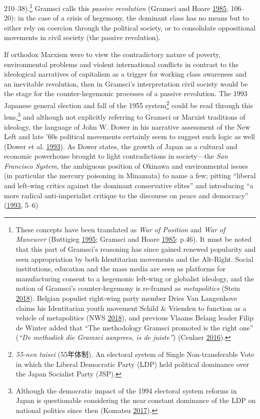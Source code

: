 \documentclass[10pt,british,A4paper,twoside]{memoir}
\begin{document}
210--38).\footnote{These concepts have been translated as \emph{War of
  Position} and \emph{War of Maneuver} (Buttigieg
  \protect\hyperlink{ref-buttigieg_gramsci_1995}{1995}; Gramsci and
  Hoare \protect\hyperlink{ref-gramsci_selections_1985}{1985}: p.46). It
  must be noted that this part of Gramsci's reasoning has since gained
  renewed popularity and seen appropriation by both Identitarian
  movements and the Alt-Right. Social institutions, education and the
  mass media are seen as platforms for manufacturing consent to a
  hegemonic left-wing or globalist ideology, and the notion of Gramsci's
  counter-hegemony is re-framed as \emph{metapolitics} (Stein
  \protect\hyperlink{ref-stein_jeff_2018}{2018}). Belgian populist
  right-wing party member Dries Van Langenhove claims his Identitarian
  youth movement Schild \& Vrienden to function as a vehicle of
  metapolitics (NWS \protect\hyperlink{ref-nws_van_2018}{2018}), and
  previous Vlaams Belang leader Filip de Winter added that ``The
  methodology Gramsci promoted is the right one'' (\emph{``De methodiek die
  Gramsci aanprees, is de juiste''}) (Ceulaer
  \protect\hyperlink{ref-ceulaer_6_2016}{2016}).} Gramsci calls this
\emph{passive revolution} (Gramsci and Hoare
\protect\hyperlink{ref-gramsci_selections_1985}{1985}, 106--20): in the
case of a crisis of hegemony, the dominant class has no means but to
either rely on coercion through the political society, or to consolidate
oppositional movements in civil society (the passive revolution).

If orthodox Marxism were to view the contradictory nature of poverty,
environmental problems and violent international conflicts in contrast
to the ideological narratives of capitalism as a trigger for working
class awareness and an inevitable revolution, then in Gramsci's
interpretation civil society would be the stage for the counter-hegemonic
processes of a passive revolution. The 1993 Japanese general election and
fall of the 1955 system\footnote{\emph{55-nen taisei} (55年体制). An
  electoral system of Single Non-transferable Vote in which the Liberal
  Democratic Party (LDP) held political dominance over the Japan
  Socialist Party (JSP).} could be read through this lens,\footnote{Although
  the democratic impact of the 1994 electoral system reforms in Japan is
  questionable considering the near constant dominance of the LDP on national politics since then (Komatsu
  \protect\hyperlink{ref-komatsu_first_2017}{2017}).} and although not
explicitly referring to Gramsci or Marxist traditions of ideology, the
language of John W. Dower in his narrative assessment of the New Left
and late '60s political movements certainly seem to suggest such logic
as well (Dower et al. \protect\hyperlink{ref-dower_peace_1993}{1993}).
As Dower states, the growth of Japan as a cultural and economic
powerhouse brought to light contradictions in society---the \emph{San
Francisco System}, the ambiguous position of Okinawa and environmental
issues (in particular the mercury poisoning in Minamata) to name a few;
pitting ``liberal and left-wing critics against the dominant
conservative elites'' and introducing ``a more radical anti-imperialist
critique to the discourse on peace and democracy''
(\protect\hyperlink{ref-dower_peace_1993}{1993}, 5--6)
\end{document}
